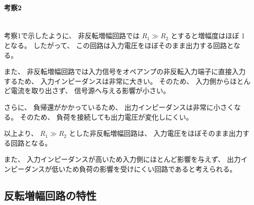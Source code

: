\documentclass[article]{jlreq}
\begin{document}
\paragraph{考察2}\mbox{}\\
考察1で示したように、
非反転増幅回路では
$R_1 \gg R_2$
とすると増幅度はほぼ
1
となる。
したがって、
この回路は入力電圧をほぼそのまま出力する回路となる。

また、
非反転増幅回路では入力信号をオペアンプの非反転入力端子に直接入力するため、
入力インピーダンスは非常に大きい。
そのため、
入力側からほとんど電流を取り出さず、
信号源へ与える影響が小さい。

さらに、
負帰還がかかっているため、
出力インピーダンスは非常に小さくなる。
そのため、
負荷を接続しても出力電圧が変化しにくい。

以上より、
$R_1 \gg R_2$
とした非反転増幅回路は、
入力電圧をほぼそのまま出力する回路となる。

また、
入力インピーダンスが高いため入力側にほとんど影響を与えず、
出力インピーダンスが低いため負荷の影響を受けにくい回路であると考えられる。


\subsection{反転増幅回路の特性}
\end{document}
